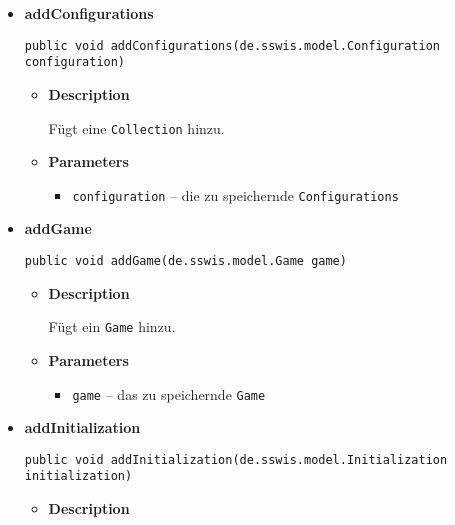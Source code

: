 {{{{{{{{\begin{itemize}
{\begin{itemize}
{Fügt eine \texttt{\small CombinedStrategy} hinzu.
}
\item{
{\bf  Parameters}
  \begin{itemize}
   \item{
\texttt{combStrategy} -- die zu speichernde \texttt{\small CombinedStrategy}}
  \end{itemize}
}%
\end{itemize}
}%
\item{ 
\hypertarget{de.sswis.controller.ModelProvider.addConfigurations(de.sswis.model.Configuration)}{{\bf  addConfigurations}\\}
\begin{lstlisting}[frame=none]
public void addConfigurations(de.sswis.model.Configuration configuration)\end{lstlisting} %
\begin{itemize}
\item{
{\bf  Description}

Fügt eine \texttt{\small Collection} hinzu.
}
\item{
{\bf  Parameters}
  \begin{itemize}
   \item{
\texttt{configuration} -- die zu speichernde \texttt{\small Configurations}}
  \end{itemize}
}%
\end{itemize}
}%
\item{ 
\hypertarget{de.sswis.controller.ModelProvider.addGame(de.sswis.model.Game)}{{\bf  addGame}\\}
\begin{lstlisting}[frame=none]
public void addGame(de.sswis.model.Game game)\end{lstlisting} %
\begin{itemize}
\item{
{\bf  Description}

Fügt ein \texttt{\small Game} hinzu.
}
\item{
{\bf  Parameters}
  \begin{itemize}
   \item{
\texttt{game} -- das zu speichernde \texttt{\small Game}}
  \end{itemize}
}%
\end{itemize}
}%
\item{ 
\hypertarget{de.sswis.controller.ModelProvider.addInitialization(de.sswis.model.Initialization)}{{\bf  addInitialization}\\}
\begin{lstlisting}[frame=none]
public void addInitialization(de.sswis.model.Initialization initialization)\end{lstlisting} %
\begin{itemize}
\item{
{\bf  Description}

}
\end{itemize}}
\end{itemize}}}}}}}}}
